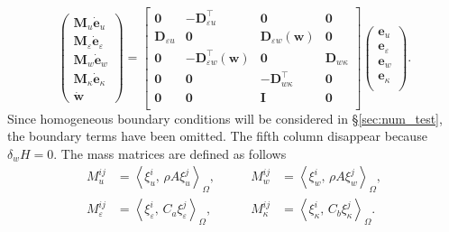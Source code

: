 \documentclass{ifacconf}
\newcommand{\inner}[3][]{\ensuremath{\left\langle #2, \, #3 \right\rangle_{#1}}}
\newcommand{\secref}[1]{\S\ref{#1}}
\begin{document}
\begin{equation}\label{eq:findimSys}
\begin{pmatrix}
	\mathbf{M}_u \dot{\mathbf{e}}_u \\
	\mathbf{M}_\varepsilon \dot{\mathbf{e}}_\varepsilon \\
	\mathbf{M}_w \dot{\mathbf{e}}_w \\
	\mathbf{M}_\kappa \dot{\mathbf{e}}_\kappa \\
	 \dot{\mathbf{w}}
\end{pmatrix} = 
\begin{bmatrix}
	\mathbf{0} & -\mathbf{D}_{\varepsilon u}^\top & \mathbf{0} & \mathbf{0}  \\
	\mathbf{D}_{\varepsilon u} & \mathbf{0} & \mathbf{D}_{\varepsilon w}(\mathbf{w}) & \mathbf{0}  \\
	\mathbf{0} & -\mathbf{D}_{\varepsilon w}^\top(\mathbf{w}) & \mathbf{0} & \mathbf{D}_{w \kappa} \\
	\mathbf{0} & \mathbf{0} & -\mathbf{D}_{w \kappa}^\top & \mathbf{0}  \\
	\mathbf{0} & \mathbf{0} & \mathbf{I} & \mathbf{0} \\ 
\end{bmatrix}
\begin{pmatrix}
	\mathbf{e}_u \\
	\mathbf{e}_\varepsilon \\
	\mathbf{e}_w \\
	\mathbf{e}_\kappa \\
\end{pmatrix}.
\end{equation}
Since homogeneous boundary conditions will be considered in \secref{sec:num_test}, the boundary terms have been omitted. The fifth column disappear because $\delta_w H=0$. The mass matrices are defined as follows
\begin{equation}
	\begin{aligned}
	M_u^{ij} &= \inner[\Omega]{\xi_u^i}{\rho A \xi_u^j}, \\
	M_\varepsilon^{ij} &= \inner[\Omega]{\xi_\varepsilon^i}{C_a \xi_\varepsilon^j}, 
	\end{aligned} \qquad 
	\begin{aligned}
	M_w^{ij} &= \inner[\Omega]{\xi_w^i}{\rho A \xi_w^j}, \\
	M_\kappa^{ij} &= \inner[\Omega]{\xi_\kappa^i}{C_b \xi_\kappa^j}.
	\end{aligned}
\end{equation}
\end{document}
